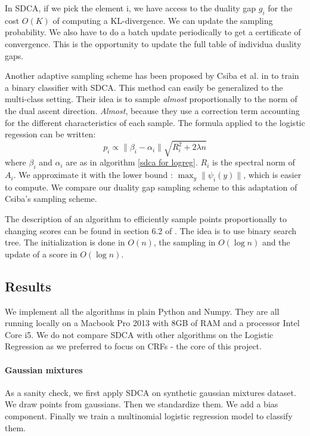 \documentclass{article}
\DeclareMathOperator{\1}{\mathbb{1}}
\begin{document}
In SDCA, if we pick the element i, we have access to the duality gap $g_i$ for the cost $O(K)$ of computing a KL-divergence.
We can update the sampling probability.
We also have to do a batch update periodically to get a certificate of convergence.
This is the opportunity to update the full table of individua duality gaps.

Another adaptive sampling scheme has been proposed by Csiba et al.  in \cite{csiba_stochastic_2015} to train a binary classifier with SDCA.
This method can easily be generalized to the multi-class setting.
Their idea is to sample \textit{almost} proportionally to the norm of the dual ascent direction.
\textit{Almost}, because they use a correction term accounting for the different characteristics of each sample.
The formula applied to the logistic regession can be written:
\begin{equation}
	\label{csiba}
	p_i \propto \| \beta_i - \alpha_i \| \sqrt{R_i^2 + 2 \lambda n} 
\end{equation}
where $\beta_i$ and $\alpha_i$ are as in algorithm \ref{sdca for logreg}. 
$R_i$ is the spectral norm of $A_i$.
We approximate it with the lower bound : $\max_y \| \psi_i(y)\|$, which is easier to compute.
We compare our duality gap sampling scheme to this adaptation of Csiba's sampling scheme.

The description of an algorithm to efficiently sample points proportionally to changing scores can be found in section 6.2 of \cite{nesterov_efficiency_2012}.
The idea is to use binary search tree.
The initialization is done in $O(n)$, the sampling in $O(\log n)$ and the update of a score in $O(\log n)$.

\subsection{Results}

We implement all the algorithms in plain Python and Numpy.
They are all running locally on a Macbook Pro 2013 with 8GB of RAM and a processor Intel Core i5.
We do not compare SDCA with other algorithms on the Logistic Regression as we preferred to focus on CRFs - the core of this project.

\paragraph{Gaussian mixtures}
As a sanity check, we first apply SDCA on synthetic gaussian mixtures dataset.
We draw points from gaussians.
Then we standardize them.
We add a bias component.
Finally we train a multinomial logistic regression model to classify them.
\end{document}
